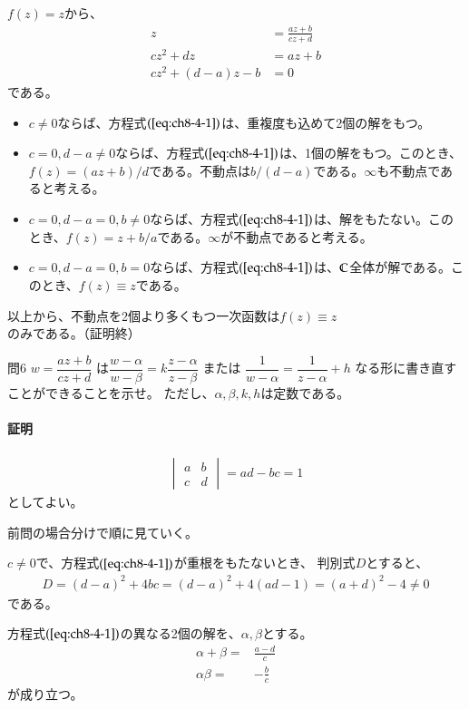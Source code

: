 $f(z)=z$から、
\begin{align}
    z&=\frac{az+b}{cz+d}\nonumber\\
    cz^2+dz&=az+b\nonumber\\
    cz^2+(d-a)z-b&=0\label{eq:ch8-4-1}
\end{align}
である。
\begin{itemize}
    \item $c\neq0$ならば、方程式$(\ref{eq:ch8-4-1})$は、重複度も込めて2個の解をもつ。
    \item $c=0,d-a\neq0$ならば、方程式$(\ref{eq:ch8-4-1})$は、1個の解をもつ。このとき、$f(z)=(az+b)/d$である。不動点は$b/(d-a)$である。$\infty$も不動点であると考える。
    \item $c=0,d-a=0,b\neq0$ならば、方程式$(\ref{eq:ch8-4-1})$は、解をもたない。このとき、$f(z)=z+b/a$である。$\infty$が不動点であると考える。
    \item $c=0,d-a=0,b=0$ならば、方程式$(\ref{eq:ch8-4-1})$は、$\mathbb{C}$全体が解である。このとき、$f(z)\equiv z$である。
\end{itemize}
以上から、不動点を2個より多くもつ一次函数は$f(z)\equiv z$のみである。（証明終）

\newpage
\begin{mysimplebox}{問6}
    $w=\dfrac{az+b}{cz+d}$
    は$\dfrac{w-\alpha}{w-\beta}=k\dfrac{z-\alpha}{z-\beta}$
    または
    $\dfrac{1}{w-\alpha}=\dfrac{1}{z-\alpha}+h$
    なる形に書き直すことができることを示せ。
    ただし、$\alpha,\beta,k,h$は定数である。
\end{mysimplebox}
\paragraph{証明}
\begin{align*}
    \begin{vmatrix}
        a&b\\
        c&d
    \end{vmatrix}
    =ad-bc=1
\end{align*}
としてよい。

前問の場合分けで順に見ていく。

$c\neq0$で、方程式$(\ref{eq:ch8-4-1})$が重根をもたないとき、
判別式$D$とすると、
\begin{align*}
    D=(d-a)^2+4bc
    =(d-a)^2+4(ad-1)
    =(a+d)^2-4\neq0
\end{align*}
である。

方程式$(\ref{eq:ch8-4-1})$の異なる2個の解を、$\alpha,\beta$とする。
\begin{align*}
    \alpha+\beta=&\frac{a-d}{c}\\
    \alpha\beta=&-\frac{b}{c}
\end{align*}
が成り立つ。

